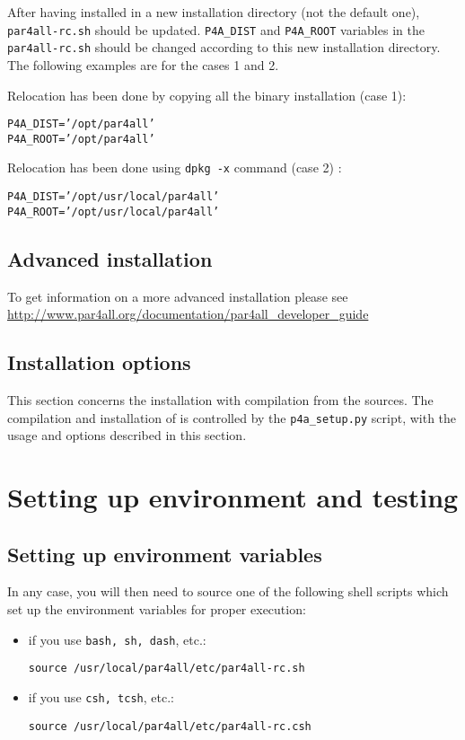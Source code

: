 \documentclass[a4paper]{article}
\begin{document}
After having installed \Apfa in a new installation directory (not the
default one), \verb|par4all-rc.sh| should be updated.  \verb|P4A_DIST| and
\verb|P4A_ROOT| variables in the \verb|par4all-rc.sh| should be changed
according to this new installation directory.  The following examples are
for the cases 1 and 2.

Relocation has been done by copying all the binary installation (case 1):
\begin{alltt}
P4A_DIST='/opt/par4all'
P4A_ROOT='/opt/par4all'
\end{alltt}

Relocation has been done using \texttt{dpkg -x} command (case 2) :
\begin{alltt}
P4A_DIST='/opt/usr/local/par4all'
P4A_ROOT='/opt/usr/local/par4all'
\end{alltt}


\subsection{Advanced installation}

To get information on a more advanced installation please see
\url{http://www.par4all.org/documentation/par4all_developer_guide}


\subsection{Installation options}
\label{sec:installation_options}

This section concerns the installation with compilation from the \Apfa
sources. The compilation and installation of \Apfa is controlled by the
\verb|p4a_setup.py| script, with the usage and options described in this
section.




\section{Setting up environment and testing \protect\Apfa}
\label{sec:testing}

\subsection{Setting up environment variables}
In any case, you will then need to source one of the following shell
scripts which set up the environment variables for proper \Apfa
execution:
\begin{itemize}
\item if you use \texttt{bash, sh, dash}, etc.:
\begin{verbatim}
source /usr/local/par4all/etc/par4all-rc.sh
\end{verbatim}
\item if you use \texttt{csh, tcsh}, etc.:
\begin{verbatim}
source /usr/local/par4all/etc/par4all-rc.csh
\end{verbatim}
\end{itemize}
\end{document}
